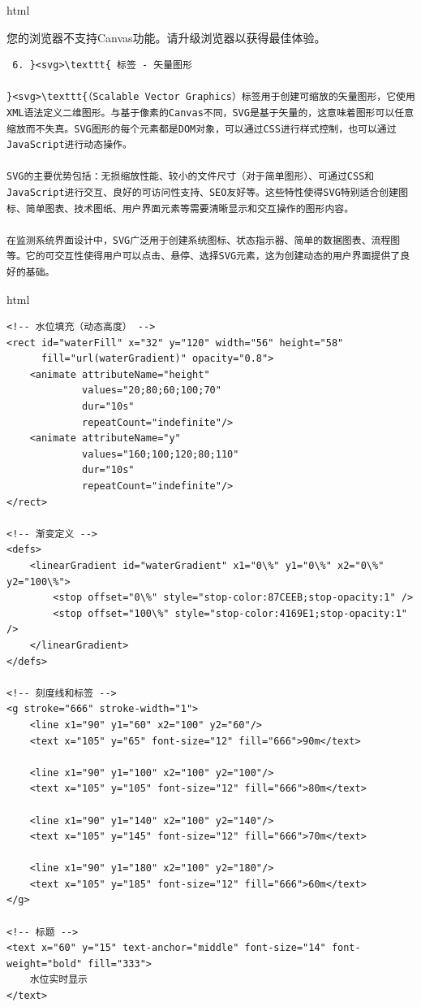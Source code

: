 html

您的浏览器不支持Canvas功能。请升级浏览器以获得最佳体验。

\begin{lstlisting}
 6. }<svg>\texttt{ 标签 - 矢量图形

}<svg>\texttt{（Scalable Vector Graphics）标签用于创建可缩放的矢量图形，它使用XML语法定义二维图形。与基于像素的Canvas不同，SVG是基于矢量的，这意味着图形可以任意缩放而不失真。SVG图形的每个元素都是DOM对象，可以通过CSS进行样式控制，也可以通过JavaScript进行动态操作。

SVG的主要优势包括：无损缩放性能、较小的文件尺寸（对于简单图形）、可通过CSS和JavaScript进行交互、良好的可访问性支持、SEO友好等。这些特性使得SVG特别适合创建图标、简单图表、技术图纸、用户界面元素等需要清晰显示和交互操作的图形内容。

在监测系统界面设计中，SVG广泛用于创建系统图标、状态指示器、简单的数据图表、流程图等。它的可交互性使得用户可以点击、悬停、选择SVG元素，这为创建动态的用户界面提供了良好的基础。
\end{lstlisting}

html

\begin{verbatim}
<!-- 水位填充（动态高度） -->
<rect id="waterFill" x="32" y="120" width="56" height="58" 
      fill="url(waterGradient)" opacity="0.8">
    <animate attributeName="height" 
             values="20;80;60;100;70" 
             dur="10s" 
             repeatCount="indefinite"/>
    <animate attributeName="y" 
             values="160;100;120;80;110" 
             dur="10s" 
             repeatCount="indefinite"/>
</rect>

<!-- 渐变定义 -->
<defs>
    <linearGradient id="waterGradient" x1="0\%" y1="0\%" x2="0\%" y2="100\%">
        <stop offset="0\%" style="stop-color:87CEEB;stop-opacity:1" />
        <stop offset="100\%" style="stop-color:4169E1;stop-opacity:1" />
    </linearGradient>
</defs>

<!-- 刻度线和标签 -->
<g stroke="666" stroke-width="1">
    <line x1="90" y1="60" x2="100" y2="60"/>
    <text x="105" y="65" font-size="12" fill="666">90m</text>
    
    <line x1="90" y1="100" x2="100" y2="100"/>
    <text x="105" y="105" font-size="12" fill="666">80m</text>
    
    <line x1="90" y1="140" x2="100" y2="140"/>
    <text x="105" y="145" font-size="12" fill="666">70m</text>
    
    <line x1="90" y1="180" x2="100" y2="180"/>
    <text x="105" y="185" font-size="12" fill="666">60m</text>
</g>

<!-- 标题 -->
<text x="60" y="15" text-anchor="middle" font-size="14" font-weight="bold" fill="333">
    水位实时显示
</text>
\end{verbatim}

